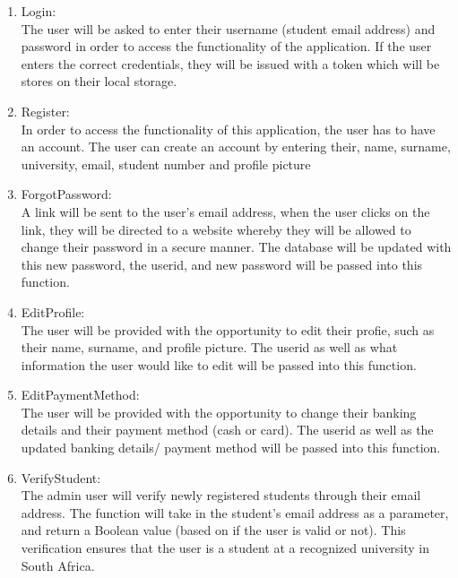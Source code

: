\documentclass[hidelinks, 12pt, a4paper]{article}
\begin{document}
             \begin{enumerate}[label=U1.\arabic*]
    
                \item Login:\\
                	The user will be asked to enter their username (student email address) and password in order to access the functionality of the application. If the user enters the correct credentials, they will be issued with a token which will be stores on their local storage.

                \item Register:\\
                	In order to access the functionality of this application, the user has to have an account. The user can create an account by entering their, name, surname, university, email, student number and profile picture

                \item ForgotPassword:\\
                	A link will be sent to the user’s email address, when the user clicks on the link, they will be directed to a website whereby they will be allowed to change their password in a secure manner. The database will be updated with this new password, the userid, and new password will be passed into this function.
                	
                \item EditProfile: \\
                    The user will be provided with the opportunity to edit their profie, such as their name, surname, and profile picture. The userid as well as what information the user would like to edit will be passed into this function.
                    
                \item EditPaymentMethod:\\
                    The user will be provided with the opportunity to change their banking details and their payment method (cash or card). The userid as well as the updated banking details/ payment method will be passed into this function.
                    
                \item VerifyStudent:\\
                    The admin user will verify newly registered students through their email address. The function will take in the student’s email address as a parameter, and return a Boolean value (based on if the user is valid or not). This verification ensures that the user is a student at a recognized university in South Africa.                
                    

\end{enumerate}
\end{document}
